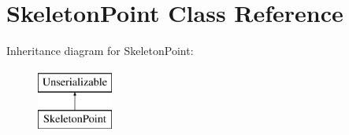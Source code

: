 \hypertarget{class_skeleton_point}{\section{\-Skeleton\-Point \-Class \-Reference}
\label{class_skeleton_point}
}
\-Inheritance diagram for \-Skeleton\-Point\-:\begin{figure}[H]
\begin{center}
\leavevmode
\includegraphics[height=2.000000cm]{class_skeleton_point}
\end{center}
\end{figure}
